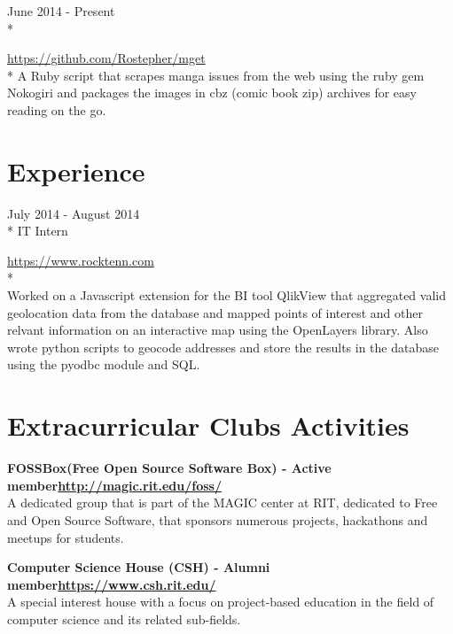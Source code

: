 \documentclass[a4paper,margin,line]{resume}
\newcommand{\rurl}[1]{\hfill {\footnotesize \url{#1}}}
\newcommand{\rdate}[1]{\hfill {\small #1}}
\newcommand{\rproject}[4]{\item[#1] \hfill \rdate{#2} \\* \hfill \rdate{#3} \strut\hfill \rurl{#4} \\*}
\begin{document}
\begin{resume}
\begin{asparadesc}
        \rproject{mget}{June 2014 - Present}{}{https://github.com/Rostepher/mget}
        \small
        A Ruby script that scrapes manga issues from the web using the ruby gem Nokogiri and packages the images in cbz (comic book zip) archives for easy reading on the go.
        \normalsize
        \\

    \end{asparadesc}

\section{\mysidestyle Experience}
	\begin{asparadesc}
        \rproject{RockTenn}{July 2014 - August 2014}{IT Intern}{https://www.rocktenn.com}
        \\
        \small
        Worked on a Javascript extension for the BI tool QlikView that aggregated valid geolocation data from the database and mapped points of interest and other relvant information on an interactive map using the OpenLayers library. Also wrote python scripts to geocode addresses and store the results in the database using the pyodbc module and SQL.
        \normalsize
	\end{asparadesc}


\section{\mysidestyle Extracurricular Clubs Activities}
	\begin{asparablank}
    \item{\bf{}FOSSBox({\small Free Open Source Software Box}) - {\small Active member}\rurl{http://magic.rit.edu/foss/}}
    \\
    A dedicated group that is part of the MAGIC center at RIT, dedicated to Free and Open Source Software, that sponsors numerous projects, hackathons and meetups for students.
    \\

    \item{\bf{}Computer Science House ({\small CSH}) - {\small Alumni member}\rurl{https://www.csh.rit.edu/}}
    \\
    A special interest house with a focus on project-based education in the field of computer science and its related sub-fields.
	\end{asparablank}

\end{resume}
\end{document}
